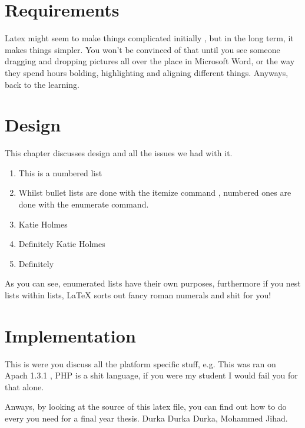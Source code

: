 \documentclass[12pt,a4paper]{report}
\begin{document}
\chapter{Requirements}
Latex might seem to make things complicated initially , but in the long term, it makes things simpler. You won't be convinced
of that until you see someone dragging and dropping pictures all over the place in Microsoft Word, or the way they spend hours
bolding, highlighting and aligning different things. Anyways, back to the learning. 


\chapter{Design}
This chapter discusses design and all the issues we had with it. 
\begin{enumerate}
\item
This is a numbered list
\item
Whilst bullet lists are done with the itemize command , numbered ones are done with the enumerate command. 
\item
Katie Holmes
\item
Definitely Katie Holmes
\item
Definitely

\end{enumerate}
As you can see, enumerated lists have their own purposes, furthermore if you nest lists within lists, LaTeX sorts out fancy roman numerals and shit for you!
\chapter{Implementation}
This is were you discuss all the platform specific stuff, e.g. This was ran on Apach 1.3.1 , PHP is a shit language, if you were my student I would fail you for that alone. 

Anways, by looking at the source of this latex file, you can find out how to do every you need for a final year thesis. Durka Durka Durka, Mohammed Jihad. 
\end{document}

